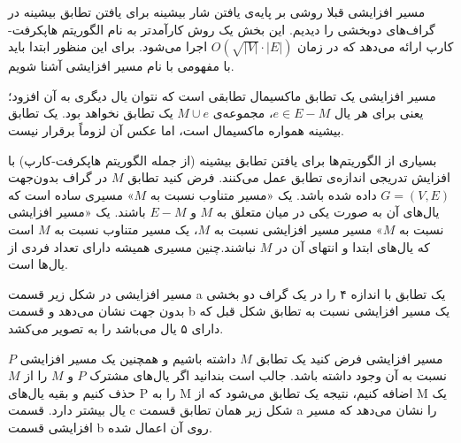 \begin{itemframe}{مسیر افزایشی}
\itm
قبلا روشی بر پایه‌ی یافتن شار بیشینه برای یافتن تطابق بیشینه در گراف‌های دو‌بخشی را دیدیم.
\itm
این بخش یک روش کارآمدتر به نام الگوریتم هاپکرفت-کارپ
 ارائه می‌دهد که در زمان
 $O(\sqrt{|V|} \cdot |E|)$
 اجرا می‌شود.
\itm
برای این منظور ابتدا باید با مفهومی با نام مسیر افزایشی آشنا شویم.
\end{itemframe}

\begin{itemframe}{مسیر افزایشی}
\itm
یک تطابق ماکسیمال
 تطابقی است که نتوان یال دیگری به آن افزود؛ یعنی برای هر یال $e \in E - M$، مجموعه‌ی $M \cup {e}$ یک تطابق نخواهد بود. یک تطابق بیشینه همواره ماکسیمال است، اما عکس آن لزوماً برقرار نیست.

\itm
بسیاری از الگوریتم‌ها برای یافتن تطابق بیشینه (از جمله الگوریتم هاپکرفت-کارپ) با افزایش تدریجی اندازه‌ی تطابق عمل می‌کنند.
\itm
فرض کنید تطابق $M$ در گراف بدون‌جهت $G = (V, E)$ داده شده باشد. یک «مسیر متناوب نسبت به $M$»
مسیری ساده است که یال‌های آن به صورت یکی در میان متعلق به $M$ و $E - M$ باشند.
\itm
یک «مسیر افزایشی نسبت به $M$»
مسیر مسیر افزایشی نسبت به $M$، یک مسیر متناوب نسبت به $M$ است که یال‌های ابتدا و انتهای آن در $M$ نباشند.چنین مسیری همیشه دارای تعداد فردی از یال‌ها است.
\end{itemframe}

\begin{itemframe}{مسیر افزایشی}
\itm
در شکل زیر قسمت a یک تطابق با اندازه ۴ را در یک گراف دو بخشی بدون جهت نشان می‌دهد و قسمت b یک مسیر افزایشی نسبت به تطابق شکل قبل که دارای ۵ یال می‌باشد را به تصویر می‌کشد.

\end{itemframe}

\begin{itemframe}{مسیر افزایشی}
\decLineSpace[1mm]
\itm
فرض کنید یک تطابق $M$ داشته باشیم و همچنین یک مسیر افزایشی $P$ نسبت به آن وجود داشته باشد. جالب است بندانید اگر یال‌های مشترک $P$ و $M$ را از $M$ حذف کنیم و بقیه یال‌های P را به M اضافه کنیم، نتیجه یک تطابق می‌شود که از M یک یال بیشتر دارد.
\itm
قسمت c شکل زیر همان تطابق قسمت a را نشان می‌دهد که مسیر افزایشی قسمت b روی آن اعمال شده.

\end{itemframe}

